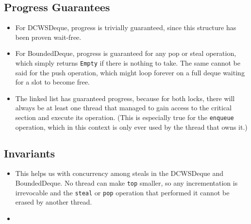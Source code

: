 \documentclass [10pt]{scrartcl}
\begin{document}
   \subsection{Progress Guarantees}
   \begin{itemize}
      \item For DCWSDeque, progress is trivially guaranteed, since this structure has been proven wait-free.
      \item For BoundedDeque, progress is guaranteed for any pop or steal operation, which simply returns \texttt{Empty} if there is nothing to take. The same cannot be said for the push operation, which might loop forever on a full deque waiting for a slot to become free.
      \item The linked list has guaranteed progress, because for both locks, there will always be at least one thread that managed to gain access to the critical section and execute its operation. (This is especially true for the \texttt{enqueue} operation, which in this context is only ever used by the thread that owns it.)
   \end{itemize}
   
   \subsection{Invariants}
   \begin{itemize}
      \item {}
      This helps us with concurrency among steals in the DCWSDeque and BoundedDeque. No thread can make \texttt{top} smaller, so any incrementation is irrevocable and the \texttt{steal} or \texttt{pop} operation that performed it cannot be erased by another thread.
      \item {}
   \end{itemize}
   
\end{document}
